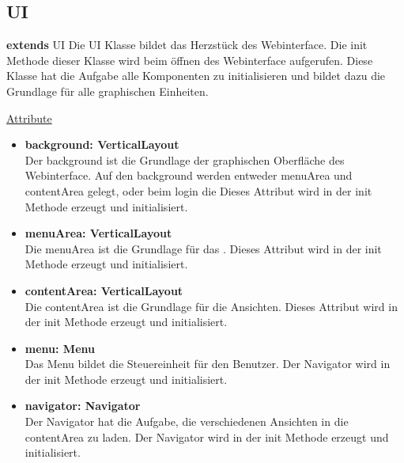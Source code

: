 \newpage
\subsection{UI}\label{UI}
\textbf{extends}  UI \newline
Die UI Klasse bildet das Herzstück des Webinterface. Die init Methode dieser Klasse wird beim öffnen des Webinterface aufgerufen. Diese Klasse hat die Aufgabe alle Komponenten zu initialisieren und bildet dazu die Grundlage für alle graphischen Einheiten.
\newline

\underline{Attribute}
\begin{itemize}
\itemsep0pt

\item \textbf{background: VerticalLayout} \hfill\\ 
Der background ist die Grundlage der graphischen Oberfläche des Webinterface. Auf den background werden entweder menuArea und contentArea gelegt, oder beim login die  Dieses Attribut wird in der init Methode erzeugt und initialisiert.

\item \textbf{menuArea: VerticalLayout} \hfill\\ 
Die menuArea ist die Grundlage für das . Dieses Attribut wird in der init Methode erzeugt und initialisiert.

\item \textbf{contentArea: VerticalLayout} \hfill\\ 
Die contentArea ist die Grundlage für die Ansichten. Dieses Attribut wird in der init Methode erzeugt und initialisiert.

\item \textbf{menu: Menu} \hfill\\ 
Das Menu bildet die Steuereinheit für den Benutzer. Der Navigator wird in der init Methode erzeugt und initialisiert.

\item \textbf{navigator: Navigator} \hfill\\ 
Der Navigator hat die Aufgabe, die verschiedenen Ansichten in die contentArea zu laden. Der Navigator wird in der init Methode erzeugt und initialisiert.

\end{itemize}

